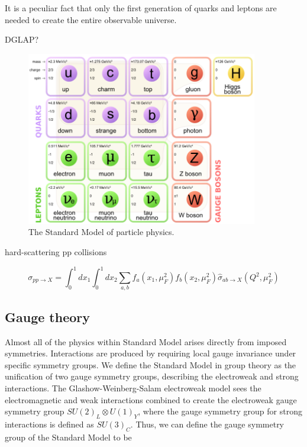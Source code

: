 It is a peculiar fact that only the first generation of quarks and leptons are needed to create the entire observable universe.

DGLAP?

\begin{figure} \label{fig-SM}
\begin{center}
\includegraphics[width=0.9\textwidth]{Figures/StandardModel.png}
\caption{The Standard Model of particle physics.}
\end{center}
\end{figure}

hard-scattering pp collisions

\begin{equation}
\sigma_{pp \to X} = \int^1_0dx_1 \int^1_0dx_2 \sum_{a,b} f_a(x_1, \mu_F^2) f_b(x_2, \mu_F^2) \hat{\sigma}_{ab \to X}(Q^2, \mu_F^2)
\end{equation}


\subsection{Gauge theory}

Almost all of the physics within Standard Model arises directly from imposed symmetries. Interactions are produced by requiring local gauge invariance under specific symmetry groups. We define the Standard Model in group theory as the unification of two gauge symmetry groups, describing the electroweak and strong interactions. The Glashow-Weinberg-Salam electroweak model sees the electromagnetic and weak interactions combined to create the electroweak gauge symmetry group $SU(2)_L \otimes U(1)_Y$, where the gauge symmetry group for strong interactions is defined as $SU(3)_C$. Thus, we can define the gauge symmetry group of the Standard Model to be 

